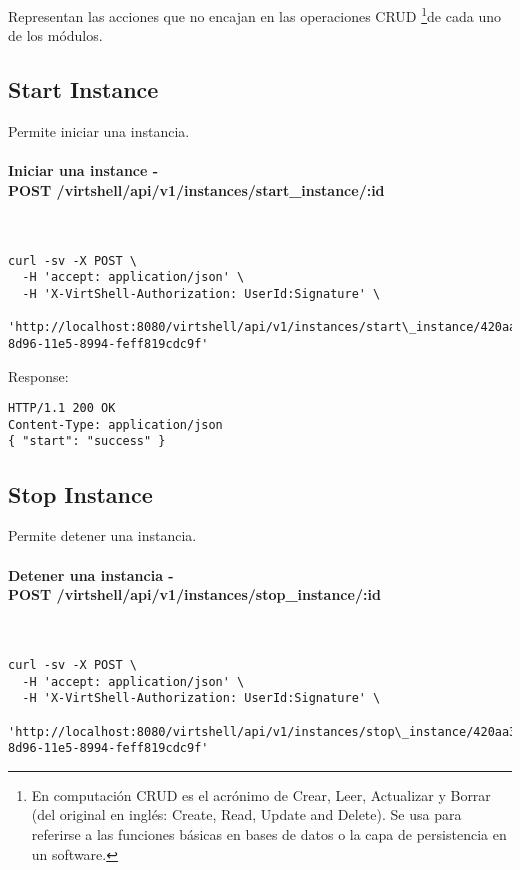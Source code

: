 Representan las acciones que no encajan en las operaciones CRUD \footnote{En computación CRUD es el acrónimo de Crear, Leer, Actualizar y Borrar (del original en inglés: Create, Read, Update and Delete). Se usa para referirse a las funciones básicas en bases de datos o la capa de persistencia en un software.}de cada uno de los módulos.

\subsection{Start Instance}

Permite iniciar una instancia.

\paragraph{Iniciar una instance - \\ POST /virtshell/api/v1/instances/start\_instance/:id} ~\\


\begin{lstlisting}[style=json]
curl -sv -X POST \
  -H 'accept: application/json' \
  -H 'X-VirtShell-Authorization: UserId:Signature' \
   'http://localhost:8080/virtshell/api/v1/instances/start\_instance/420aa3f0-8d96-11e5-8994-feff819cdc9f'
\end{lstlisting}

Response:

\begin{lstlisting}[style=json]
HTTP/1.1 200 OK
Content-Type: application/json
{ "start": "success" }
\end{lstlisting}


\subsection{Stop Instance}

Permite detener una instancia.

\paragraph{Detener una instancia - \\ POST /virtshell/api/v1/instances/stop\_instance/:id} ~\\

\begin{lstlisting}[style=json]
curl -sv -X POST \
  -H 'accept: application/json' \
  -H 'X-VirtShell-Authorization: UserId:Signature' \
   'http://localhost:8080/virtshell/api/v1/instances/stop\_instance/420aa3f0-8d96-11e5-8994-feff819cdc9f'
\end{lstlisting}


